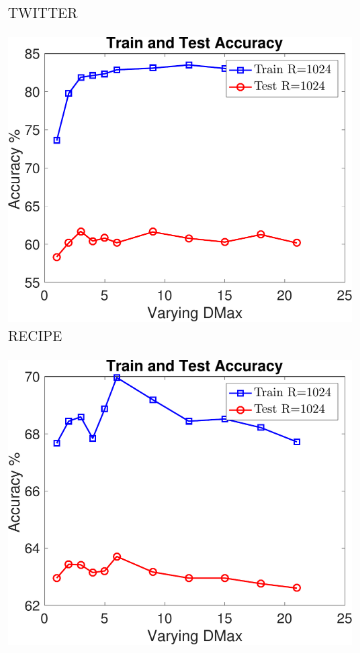 \documentclass[11pt,a4paper]{article}
\newcommand{\1}{\boldsymbol{1}}
\begin{document}
\begin{figure}[htb]
\begin{subfigure}[b]{0.23\textwidth}
      \caption{TWITTER}
      \label{App:fig:exptsA_varyingD_twitter}
      \end{subfigure}
		\begin{subfigure}[b]{0.23\textwidth}
      \includegraphics[width=\textwidth]{Graphs/wmdk_varyingD/recipe2_Accu_VaryingD_CV_R1024_dataSplit1-eps-converted-to.pdf}
      \caption{RECIPE}
      \label{App:fig:exptsA_varyingD_recipe2}
      \end{subfigure}
		\begin{subfigure}[b]{0.23\textwidth}
      \includegraphics[width=\textwidth]{Graphs/wmdk_varyingD/ohsumed_Accu_VaryingD_CV_R1024_dataSplit1-eps-converted-to.pdf}

\end{subfigure}
\end{figure}
\end{document}
